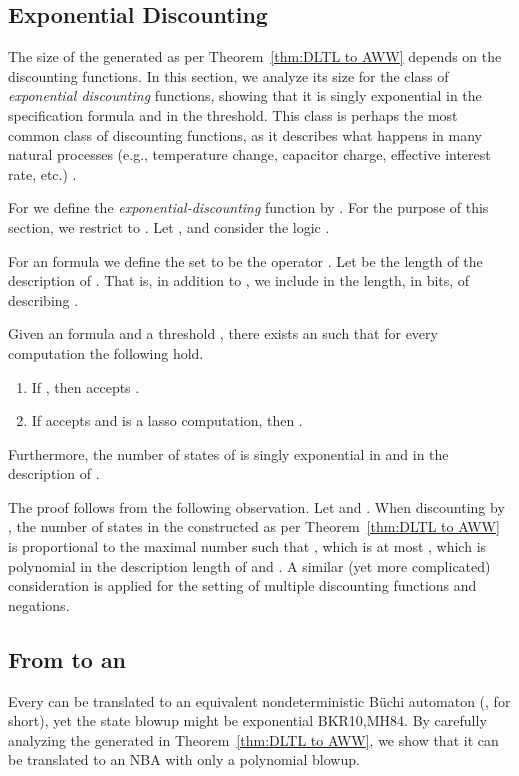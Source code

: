 \documentclass{llncs}
\newcommand{\NBW}{\mbox{\rm NBA}\xspace}
\begin{document}
\subsection{Exponential Discounting}
\newcommand{\dfl}[1]{\exp_{#1}} \newcommand{\fac}{F}
\label{subsec:ExpDiscounting}
The size of the  generated as per Theorem~\ref{thm:DLTL to AWW} depends on the discounting functions.
In this section, we analyze its size for the class of {\em exponential discounting} functions, showing that it is singly exponential in the specification formula and in the threshold. This class is perhaps the most common class of discounting functions, as it describes what happens in many natural processes (e.g., temperature change, capacitor charge, effective interest rate, etc.) \cite{AHM03,Sha53}.

For  we define the {\em exponential-discounting} function  by .
For the purpose of this section, we restrict to .
Let , and consider the logic .

For an  formula  we define the set  to be   the operator . Let  be the length of the description of . That is, in addition to , we include in  the length, in bits, of describing .
\begin{theorem}
\label{thm: exp disc to AWW}
Given an  formula  and a threshold , there exists an   such that for every computation  the following hold.
\begin{enumerate}
\item If , then  accepts .
\item If  accepts  and  is a lasso computation, then .
\end{enumerate} 
Furthermore, the number of states of  is singly exponential in  and in the description of .
\end{theorem}
The proof follows from the following observation. Let  and . When discounting by , the number of states in the  constructed as per Theorem~\ref{thm:DLTL to AWW} is proportional to the maximal number  such that , which is at most , which is polynomial in the description length of  and . A similar (yet more complicated) consideration is applied for the setting of multiple discounting functions and negations.


\subsection{From  to an }
Every  can be translated to an equivalent nondeterministic B\"uchi automaton (, for short), yet the state blowup might be exponential 
{BKR10,MH84}. 
By carefully analyzing the   generated in Theorem~\ref{thm:DLTL to AWW}, we show that it can be translated to an \NBW with only a polynomial blowup.
\end{document}
